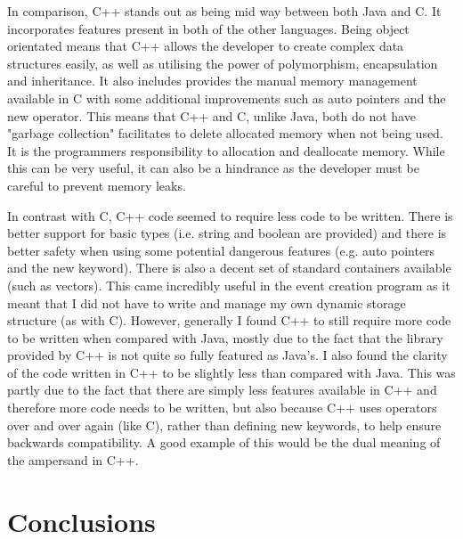 \documentclass{article}
\begin{document}
In comparison, C++ stands out as being mid way between both Java and C. It incorporates features present in both of the other languages. Being object orientated means that C++ allows the developer to create complex data structures easily, as well as utilising the power of polymorphism, encapsulation and inheritance. It also includes provides the manual memory management available in C with some additional improvements such as auto pointers and the new operator. This means that C++ and C, unlike Java, both do not have "garbage collection" facilitates to delete allocated memory when not being used. It is the programmers responsibility to allocation and deallocate memory. While this can be very useful, it can also be a hindrance as the developer must be careful to prevent memory leaks.

In contrast with C, C++ code seemed to require less code to be written. There is better support for basic types (i.e. string and boolean are provided) and there is better safety when using some potential dangerous features (e.g. auto pointers and the new keyword). There is also a decent set of standard containers available (such as vectors). This came incredibly useful in the event creation program as it meant that I did not have to write and manage my own dynamic storage structure (as with C). However, generally I found C++ to still require more code to be written when compared with Java, mostly due to the fact that the library provided by C++ is not quite so fully featured as Java's. I also found the clarity of the code written in C++ to be slightly less than compared with Java. This was partly due to the fact that there are simply less features available in C++ and therefore more code needs to be written, but also because C++ uses operators over and over again (like C), rather than defining new keywords, to help ensure backwards compatibility. A good example of this would be the dual meaning of the ampersand in C++.

\section{Conclusions}
\end{document}
